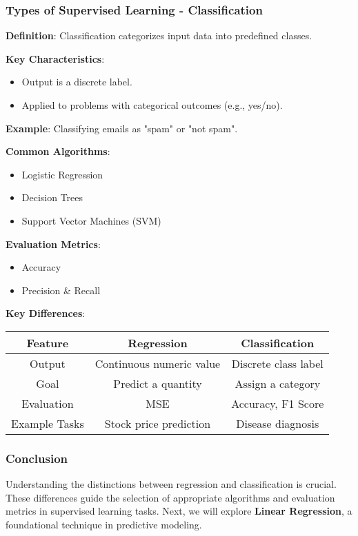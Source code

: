 \documentclass[aspectratio=169]{beamer}
\begin{document}
\begin{frame}[fragile]
    \frametitle{Types of Supervised Learning - Classification}
    \textbf{Definition}:
    Classification categorizes input data into predefined classes.

    \textbf{Key Characteristics}:
    \begin{itemize}
        \item Output is a discrete label.
        \item Applied to problems with categorical outcomes (e.g., yes/no).
    \end{itemize}
    
    \textbf{Example}: Classifying emails as "spam" or "not spam".

    \textbf{Common Algorithms}:
    \begin{itemize}
        \item Logistic Regression
        \item Decision Trees
        \item Support Vector Machines (SVM)
    \end{itemize}

    \textbf{Evaluation Metrics}:
    \begin{itemize}
        \item Accuracy
        \item Precision \& Recall
    \end{itemize}

    \textbf{Key Differences}:
    \begin{tabular}{|c|c|c|}
        \hline
        Feature & Regression & Classification \\
        \hline
        Output & Continuous numeric value & Discrete class label \\
        Goal & Predict a quantity & Assign a category \\
        Evaluation & MSE & Accuracy, F1 Score \\
        Example Tasks & Stock price prediction & Disease diagnosis \\
        \hline
    \end{tabular}
\end{frame}

\begin{frame}[fragile]
    \frametitle{Conclusion}
    Understanding the distinctions between regression and classification is crucial. 
    These differences guide the selection of appropriate algorithms and evaluation metrics in supervised learning tasks.
    Next, we will explore \textbf{Linear Regression}, a foundational technique in predictive modeling.
\end{frame}
\end{document}
